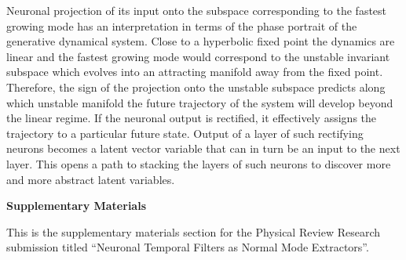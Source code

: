 \documentclass[%
 reprint,
 amsmath,amssymb,
 aps,
]{revtex4-2}
\begin{document}
Neuronal projection of its input onto the subspace corresponding to the fastest growing mode has an interpretation in terms of the phase portrait of the generative dynamical system. Close to a hyperbolic fixed point the dynamics are linear and the fastest growing mode would correspond to the unstable invariant subspace which evolves into an attracting manifold away from the fixed point. Therefore, the sign of the projection onto the unstable subspace predicts along which unstable manifold the future trajectory of the system will develop beyond the linear regime. If the neuronal output is rectified, it effectively assigns the trajectory to a particular future state. Output of a layer of such rectifying neurons becomes a latent vector variable that can in turn be an input to the next layer. This opens a path to stacking the layers of such neurons to discover more and more abstract latent variables. 










\clearpage
\appendix

\begin{center}\LARGE{\textbf{Supplementary Materials}}\end{center}
\vspace{3pt}
This is the supplementary materials section for the Physical Review Research submission titled ``Neuronal Temporal Filters as
Normal Mode Extractors''.
\end{document}
